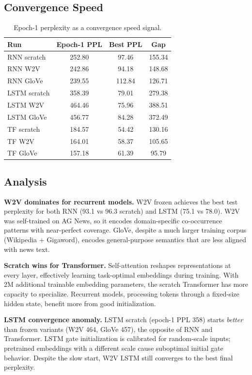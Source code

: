 \documentclass[11pt]{article}
\begin{document}
\subsection{Convergence Speed}

\begin{table}[H]
\centering\small
\begin{tabular}{lccc}
\toprule
\textbf{Run} & \textbf{Epoch-1 PPL} & \textbf{Best PPL} & \textbf{Gap} \\
\midrule
RNN scratch & 252.80 & 97.46 & 155.34 \\
RNN W2V & 242.86 & 94.18 & 148.68 \\
RNN GloVe & 239.55 & 112.84 & 126.71 \\
LSTM scratch & 358.39 & 79.01 & 279.38 \\
LSTM W2V & 464.46 & 75.96 & 388.51 \\
LSTM GloVe & 456.77 & 84.28 & 372.49 \\
TF scratch & 184.57 & 54.42 & 130.16 \\
TF W2V & 164.01 & 58.37 & 105.65 \\
TF GloVe & 157.18 & 61.39 & 95.79 \\
\bottomrule
\end{tabular}
\caption{Epoch-1 perplexity as a convergence speed signal.}
\label{tab:convergence}
\end{table}

\subsection{Analysis}

\textbf{W2V dominates for recurrent models.} W2V frozen achieves the best test perplexity for both RNN (93.1 vs 96.3 scratch) and LSTM (75.1 vs 78.0). W2V was self-trained on AG News, so it encodes domain-specific co-occurrence patterns with near-perfect coverage. GloVe, despite a much larger training corpus (Wikipedia + Gigaword), encodes general-purpose semantics that are less aligned with news text.

\textbf{Scratch wins for Transformer.} Self-attention reshapes representations at every layer, effectively learning task-optimal embeddings during training. With 2M additional trainable embedding parameters, the scratch Transformer has more capacity to specialize. Recurrent models, processing tokens through a fixed-size hidden state, benefit more from good initialization.

\textbf{LSTM convergence anomaly.} LSTM scratch (epoch-1 PPL 358) starts \emph{better} than frozen variants (W2V 464, GloVe 457), the opposite of RNN and Transformer. LSTM gate initialization is calibrated for random-scale inputs; pretrained embeddings with a different scale cause suboptimal initial gate behavior. Despite the slow start, W2V LSTM still converges to the best final perplexity.
\end{document}
